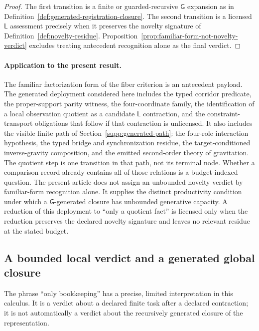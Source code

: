 \documentclass[11pt]{article}
\newcommand{\GOp}{\ensuremath{\mathsf{G}}}
\newcommand{\LOp}{\ensuremath{\mathsf{L}}}
\theoremstyle{definition}
\begin{document}
\begin{proof}
The first transition is a finite or guarded-recursive $\GOp$ expansion as in
Definition~\ref{def:generated-registration-closure}. The second transition is a
licensed $\LOp$ assessment precisely when it preserves the novelty signature of
Definition~\ref{def:novelty-residue}. Proposition~\ref{prop:familiar-form-not-novelty-verdict}
excludes treating antecedent recognition alone as the final verdict.
\end{proof}

\paragraph{Application to the present result.}
The familiar factorization form of the fiber criterion is an antecedent payload.
The generated deployment considered here includes the typed corridor predicate,
the proper-support parity witness, the four-coordinate family, the identification
of a local observation quotient as a candidate $\LOp$ contraction, and the
constraint-transport obligations that follow if that contraction is unlicensed. It
also includes the visible finite path of Section~\ref{supp:generated-path}: the
four-role interaction hypothesis, the typed bridge and synchronization residue, the
target-conditioned inverse-gravity composition, and the emitted second-order theory
of gravitation. The quotient step is one transition in that path, not its terminal
node. Whether a comparison record already contains all of those relations is a
budget-indexed question. The present article does not assign an unbounded novelty
verdict by familiar-form recognition alone. It supplies the distinct productivity
condition under which a $\GOp$-generated closure has unbounded generative capacity.
A reduction of this deployment to ``only a quotient fact'' is licensed only when
the reduction preserves the declared novelty signature and leaves no relevant
residue at the stated budget.


\subsection{A bounded local verdict and a generated global closure}
\label{supp:bookkeeping-generated-closure}

The phrase ``only bookkeeping'' has a precise, limited interpretation in this
calculus. It is a verdict about a declared finite task after a declared
contraction; it is not automatically a verdict about the recursively generated
closure of the representation.
\end{document}
